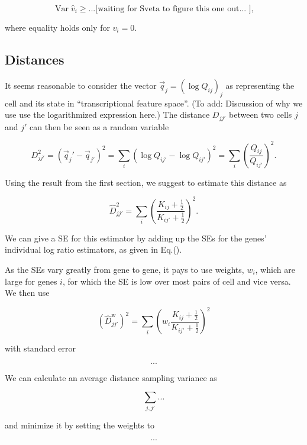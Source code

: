\documentclass{article}
\begin{document}
\[ \operatorname{Var}\hat v_i \ge ... \text{[waiting for Sveta to figure this one out...  ]}, \]

where equality holds only for $v_i=0$.


\subsection*{Distances}

It seems reasonable to consider the vector $\vec q_j = \left( \log Q_{ij} \right)_j$ as representing the cell and its state in
``transcriptional feature space''. (To add: Discussion of why we use use the logarithmized expression here.) The distance $D_{jj'}$ between
two cells $j$ and $j'$ can then be seen as a random variable

\[ D_{jj'}^2 = (\vec q_j' - \vec q_{j'})^2 = \sum_i\left( \log Q_{ij'} - \log Q_{ij'} \right)^2 = \sum_i\left( \frac{Q_{ij}}{Q_{ij'}} \right)^2. \]

Using the result from the first section, we suggest to estimate this distance as

\[ \hat D_{jj'}^2 = \sum_i\left( \frac{K_{ij}+\frac{1}{2}}{K_{ij'}+\frac{1}{2}} \right)^2. \]

We can give a SE for this estimator by adding up the SEs for the genes' individual log ratio estimators, as given in Eq.().

As the SEs vary greatly from gene to gene, it pays to use weights, $w_i$, which are large for genes $i$, for which the SE is low over
most pairs of cell and vice versa. We then use

\[ (\hat D^\text{w}_{jj'})^2 = \sum_i\left( w_i \frac{K_{ij}+\frac{1}{2}}{K_{ij'}+\frac{1}{2}} \right)^2 \]

with standard error

\[ ... \]

We can calculate an average distance sampling variance as

\[ \sum_{j,j'} ... \]

and minimize it by setting the weights to

\[ ... \]
\end{document}
